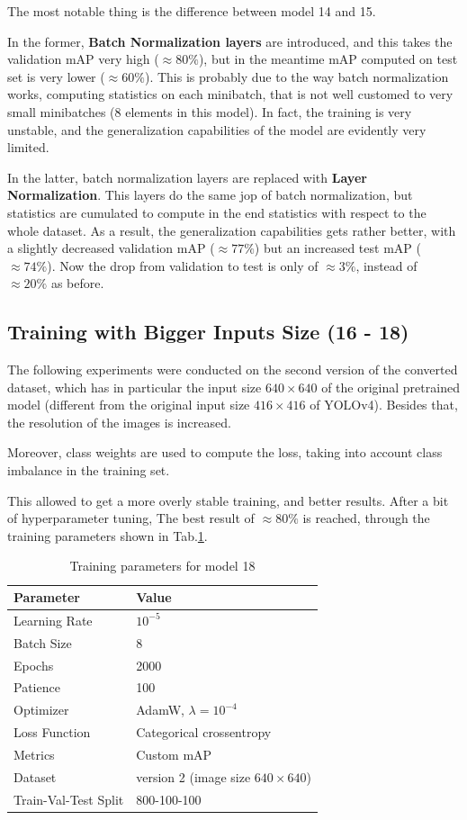 \documentclass[a4paper,12pt]{article}
\begin{document}
The most notable thing is the difference between model 14 and 15.

In the former, \textbf{Batch Normalization layers} are introduced, and this takes the validation mAP very high ($\approx 80 \% $), but in the meantime mAP computed on test set is very lower ($\approx 60 \% $). This is probably due to the way batch normalization works, computing statistics on each minibatch, that is not well customed to very small minibatches (8 elements in this model). In fact, the training is very unstable, and the generalization capabilities of the model are evidently very limited.

In the latter, batch normalization layers are replaced with \textbf{Layer Normalization}. This layers do the same jop of batch normalization, but statistics are cumulated to compute in the end statistics with respect to the whole dataset. As a result, the generalization capabilities gets rather better, with a slightly decreased validation mAP ($\approx 77 \% $) but an increased test mAP ($\approx 74 \% $). Now the drop from validation to test is only of $\approx3\% $, instead of $\approx20\% $ as before.


\subsection{Training with Bigger Inputs Size (16 - 18)}
The following experiments were conducted on the second version of the converted dataset, which has in particular the input size $640\times640$ of the original pretrained model (different from the original input size $416\times416$ of YOLOv4). Besides that, the resolution of the images is increased.

Moreover, class weights are used to compute the loss, taking into account class imbalance in the training set.

This allowed to get a more overly stable training, and better results. After a bit of hyperparameter tuning, The best result of $\approx80\%$ is reached, through the training parameters shown in Tab.\ref{tab:training-params-yolov8-2}.

\begin{table}[h]
	\centering
	\begin{tabular}{ll}
		\toprule
		\textbf{Parameter} & \textbf{Value} \\
		\midrule
		Learning Rate & $ 10^{-5} $ \\
		Batch Size & 8 \\
		Epochs & 2000 \\
		Patience & 100 \\
		Optimizer & AdamW, $\lambda=10^{-4}$ \\
		Loss Function & Categorical crossentropy\\
		Metrics & Custom mAP \\
		Dataset & version 2 (image size $ 640 \times 640 $) \\
		Train-Val-Test Split & 800-100-100 \\
		\bottomrule
	\end{tabular}
	\caption{Training parameters for model 18}
	\label{tab:training-params-yolov8-2}
\end{table}
\end{document}
